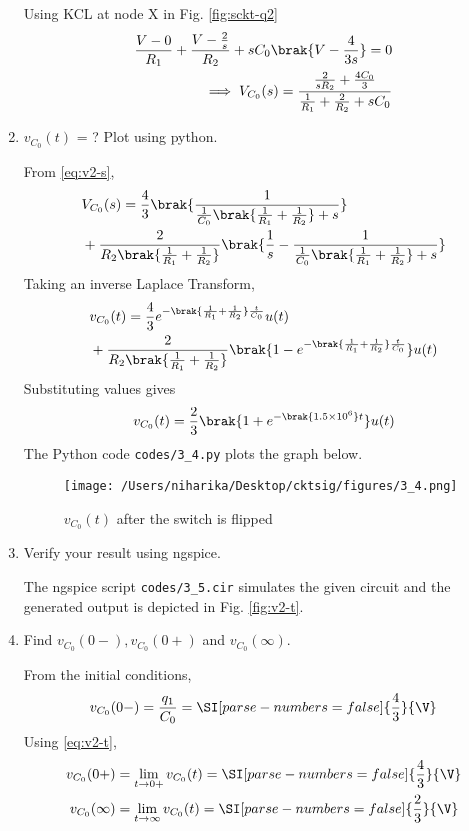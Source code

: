 \documentclass[journal,12pt,twocolumn]{IEEEtran}
\renewcommand\thesection{\arabic{section}}
\begin{document}
\begin{enumerate}[label=\arabic*.,ref=\thesection.\theenumi]
\solution Using KCL at node X in Fig. \ref{fig:sckt-q2}
\begin{align}
    \frac{V - 0}{R_1} + \frac{V - \frac{2}{s}}{R_2} + sC_0\brak{V - \frac{4}{3s}} = 0 \\
\implies V_{C_0}(s) = \frac{\frac{2}{sR_2} + \frac{4C_0}{3}}{\frac{1}{R_1} + \frac{2}{R_2} + sC_0}
\label{eq:v2-s}
\end{align}
\item $v_{C_0}(t)$ = ? Plot using python.

\solution From \eqref{eq:v2-s},
\begin{align}
    &V_{C_0}(s) = \frac{4}{3}\brak{\frac{1}{\frac{1}{C_0}\brak{\frac{1}{R_1} + \frac{1}{R_2}}+s}} \nonumber \\
    &+ \frac{2}{R_2\brak{\frac{1}{R_1} +\frac{1}{R_2}}}\brak{\frac{1}{s} - \frac{1}{\frac{1}{C_0}\brak{\frac{1}{R_1} + \frac{1}{R_2}} + s}}
\end{align}
Taking an inverse Laplace Transform,
\begin{align}
    &v_{C_0}(t) = \frac{4}{3}e^{-\brak{\frac{1}{R_1} + \frac{1}{R_2}}\frac{t}{C_0}}u(t) \nonumber \\ 
    &+ \frac{2}{R_2\brak{\frac{1}{R_1}+\frac{1}{R_2}}}\brak{1 - e^{-\brak{\frac{1}{R_1} + \frac{1}{R_2}}\frac{t}{C_0}}}u(t)
\end{align}
Substituting values gives
\begin{align}
    v_{C_0}(t) = \frac{2}{3}\brak{1 +e^{-\brak{1.5 \times 10^6}t}}u(t)
    \label{eq:v2-t}
\end{align}
The Python code \texttt{codes/3\_4.py} plots the graph below.
\begin{figure}[!htb]
    \texttt{[image: /Users/niharika/Desktop/cktsig/figures/3\_4.png]}
    \caption{$v_{C_0}(t)$ after the switch is flipped}
    \label{fig:v2-t}
\end{figure}
\item Verify your result using ngspice.

\solution The ngspice script \texttt{codes/3\_5.cir} simulates the given circuit and the generated output is depicted in Fig. \eqref{fig:v2-t}.
\item Find $v_{C_0}(0-), v_{C_0}(0+)$ and  $v_{C_0}(\infty) $. 

\solution From the initial conditions,
\begin{align}
    v_{C_0}(0-) = \frac{q_1}{C_0} = \SI[parse-numbers=false]{\frac{4}{3}}{\V}
\end{align}
Using \eqref{eq:v2-t},
\begin{align}
    v_{C_0}(0+) &= \lim_{t \to 0+}v_{C_0}(t) = \SI[parse-numbers=false]{\frac{4}{3}}{\V} \\
    v_{C_0}(\infty) &= \lim_{t \to \infty}v_{C_0}(t) = \SI[parse-numbers=false]{\frac{2}{3}}{\V}
\end{align}


\end{enumerate}
\end{document}
